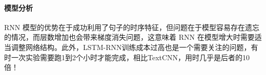 \documentclass{article}
\begin{document}
\begin{spacing}{1.1}
			\begin{figure}[H]
				\centering
				\hspace{0.2in}
			\end{figure}
		
		\paragraph*{模型分析}
			RNN 模型的优势在于成功利用了句子的时序特征，但问题在于模型容易存在遗忘的情况，而层数增加也会带来梯度消失问题，这意味着 RNN 在模型增大时需要适当调整网络结构。此外，LSTM-RNN训练成本过高也是一个需要关注的问题，有时一次实验需要跑1到2个小时才能完成，相比TextCNN，用时几乎是后者的10倍！

\end{spacing}
\end{document}
